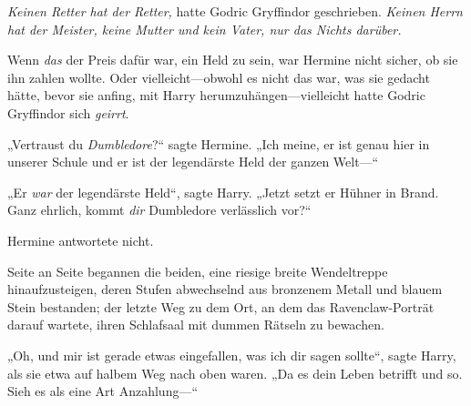 \emph{Keinen Retter hat der Retter,} hatte Godric Gryffindor geschrieben. \emph{Keinen Herrn hat der Meister, keine Mutter und kein Vater, nur das Nichts darüber.}

Wenn \emph{das} der Preis dafür war, ein Held zu sein, war Hermine nicht sicher, ob sie ihn zahlen wollte. Oder vielleicht—obwohl es nicht das war, was sie gedacht hätte, bevor sie anfing, mit Harry herumzuhängen—vielleicht hatte Godric Gryffindor sich \emph{geirrt}.

„Vertraust du \emph{Dumbledore}?“ sagte Hermine. „Ich meine, er ist genau hier in unserer Schule und er ist der legendärste Held der ganzen Welt—“

„Er \emph{war} der legendärste Held“, sagte Harry. „Jetzt setzt er Hühner in Brand. Ganz ehrlich, kommt \emph{dir} Dumbledore verlässlich vor?“

Hermine antwortete nicht.

Seite an Seite begannen die beiden, eine riesige breite Wendeltreppe hinaufzusteigen, deren Stufen abwechselnd aus bronzenem Metall und blauem Stein bestanden; der letzte Weg zu dem Ort, an dem das Ravenclaw-Porträt darauf wartete, ihren Schlafsaal mit dummen Rätseln zu bewachen.

„Oh, und mir ist gerade etwas eingefallen, was ich dir sagen sollte“, sagte Harry, als sie etwa auf halbem Weg nach oben waren. „Da es dein Leben betrifft und so. Sieh es als eine Art Anzahlung—“

